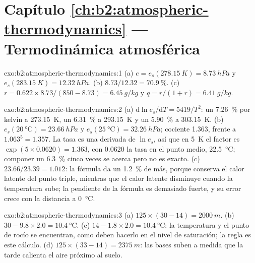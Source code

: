 \section*{Capítulo \ref{ch:b2:atmospheric-thermodynamics} --- Termodinámica atmosférica}

\begin{solution}{exo:b2:atmospheric-thermodynamics:1}
(a) $e = e_s(\qty{278.15}{K}) = \qty{8.73}{hPa}$ y $e_s(\qty{283.15}{K}) = \qty{12.32}{hPa}$.
(b) $8.73/12.32 = \qty{70.9}{\percent}$. (c) $r = 0.622 \times 8.73/(850 - 8.73) =
\qty{6.45}{g/kg}$ y $q = r/(1 + r) = \qty{6.41}{g/kg}$.
\end{solution}

\begin{solution}{exo:b2:atmospheric-thermodynamics:2}
(a) $\mathrm{d}\ln e_s/\mathrm{d}T = 5419/T^2$: un \qty{7.26}{\percent} por kelvin a
\qty{273.15}{K}, un \qty{6.31}{\percent} a \qty{293.15}{K} y un \qty{5.90}{\percent} a
\qty{303.15}{K}. (b) $e_s(\qty{20}{\celsius}) = \qty{23.66}{hPa}$ y $e_s(\qty{25}{\celsius})
= \qty{32.26}{hPa}$; cociente 1.363, frente a $1.063^5 = 1.357$. La tasa es una derivada de
$\ln e_s$, así que en \qty{5}{K} el factor es $\exp(5 \times 0.0620) = 1.363$, con 0.0620 la
tasa en el punto medio, \qty{22.5}{\celsius}; componer un \qty{6.3}{\percent} cinco veces se acerca
pero no es exacto. (c) $23.66/23.39 = 1.012$: la fórmula da un \qty{1.2}{\percent} de más, porque
conserva el calor latente del punto triple, mientras que el calor latente disminuye cuando la temperatura
sube; la pendiente de la fórmula es demasiado fuerte, y su error crece con la distancia a
\qty{0}{\celsius}.
\end{solution}

\begin{solution}{exo:b2:atmospheric-thermodynamics:3}
(a) $125 \times (30 - 14) = \qty{2000}{m}$. (b) $30 - 9.8 \times 2.0 = \qty{10.4}{\celsius}$.
(c) $14 - 1.8 \times 2.0 = \qty{10.4}{\celsius}$: la temperatura y el punto de rocío se encuentran, como deben hacerlo en
el nivel de saturación; la regla es este cálculo. (d) $125 \times (33 - 14) = \qty{2375}{m}$:
las bases suben a medida que la tarde calienta el aire próximo al suelo.
\end{solution}

